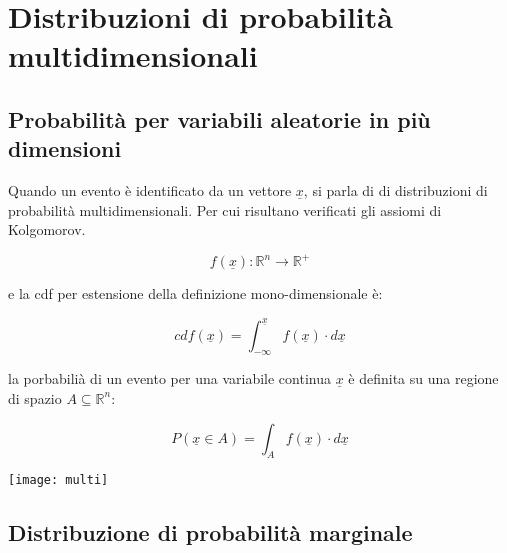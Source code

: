 \documentclass[11pt,a4paper]{book}
\begin{document}
	\setcounter{chapter}{2}
  	\chapter{Distribuzioni di probabilit\`{a} multidimensionali}
  	
  	\section{Probabilit\`{a} per variabili aleatorie in pi\`{u} \\ dimensioni}
  	
  	Quando un evento \`{e} identificato da un vettore $\underline{x}$, si parla di di distribuzioni di probabilit\`{a} multidimensionali.  Per cui risultano verificati gli assiomi di Kolgomorov.
  	
  	\begin{equation*}
  		f(\underline{x}): \mathbb{R}^n \rightarrow \mathbb{R}^+
  	\end{equation*}
  	
  	e la cdf per estensione della definizione mono-dimensionale \`{e}:
  	
	\begin{equation*}
  		cdf(\underline{x}) = \int_{-\infty}^{\underline{x}}f(\underline{x}) \cdot d\underline{x}
	\end{equation*}
  	
  	
	la porbabili\`{a} di un evento per una variabile continua $\underline{x}$ \`{e} definita su una regione di spazio $A \subseteq \mathbb{R}^n$:
  	
	\vspace{0.2in}
  \begin{minipage}{0.5\textwidth}
		\begin{equation*}
  			P(\underline{x} \in A) = \int_{A}f(\underline{x}) \cdot d\underline{x}
  		\end{equation*}
  \end{minipage}
  \begin{minipage}{.4\textwidth}
    \centering
    \texttt{[image: multi]}

  \end{minipage}
	\vspace{0.2in}


	
\section{Distribuzione di probabilit\`{a} marginale}
\end{document}
